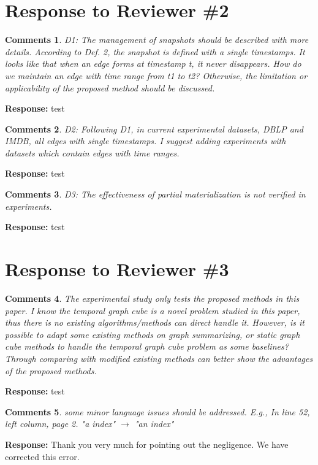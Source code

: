 \documentclass{article}
\newtheorem{Comments}{\textbf{Comments}}
\begin{document}
\section{Response to Reviewer \#2}
\setcounter{Comments}{0}
\begin{Comments}
D1: The management of snapshots should be described with more details. According to Def. 2, the snapshot is defined with a single timestamps. It looks like that when an edge forms at timestamp t, it never disappears. How do we maintain an edge with time range from t1 to t2? Otherwise, the limitation or applicability of the proposed method should be discussed.
\end{Comments}
\noindent \textbf{Response:} test

\begin{Comments}
D2: Following D1, in current experimental datasets, DBLP and IMDB, all edges with single timestamps. I suggest adding experiments with datasets which contain edges with time ranges.
\end{Comments}
\noindent \textbf{Response:} test

\begin{Comments}
D3: The effectiveness of partial materialization is not verified in experiments.
\end{Comments}
\noindent \textbf{Response:} test

\section{Response to Reviewer \#3}
\setcounter{Comments}{0}
\begin{Comments}
The experimental study only tests the proposed methods in this paper. I know the temporal graph cube is a novel problem studied in this paper, thus there is no existing algorithms/methods can direct handle it. However, is it possible to adapt some existing methods on graph summarizing, or static graph cube methods to handle the temporal graph cube problem as some baselines? Through comparing with modified existing methods can better show the advantages of the proposed methods.
\end{Comments}
\noindent \textbf{Response:} test


\begin{Comments}
 some minor language issues should be addressed. E.g., In line 52, left column, page 2. "a index" $ \rightarrow $ "an index"
\end{Comments}
\noindent \textbf{Response:} Thank you very much for pointing out the negligence. We have corrected this error.
\end{document}
